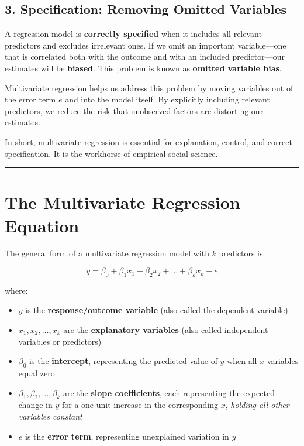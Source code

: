 \documentclass[
  letterpaper,
  DIV=11,
  numbers=noendperiod]{scrreprt}
\begin{document}
\subsection{3. Specification: Removing Omitted
Variables}\label{specification-removing-omitted-variables}

A regression model is \textbf{correctly specified} when it includes all
relevant predictors and excludes irrelevant ones. If we omit an
important variable---one that is correlated both with the outcome and
with an included predictor---our estimates will be \textbf{biased}. This
problem is known as \textbf{omitted variable bias}.

Multivariate regression helps us address this problem by moving
variables out of the error term \(e\) and into the model itself. By
explicitly including relevant predictors, we reduce the risk that
unobserved factors are distorting our estimates.

In short, multivariate regression is essential for explanation, control,
and correct specification. It is the workhorse of empirical social
science.

\begin{center}\rule{0.5\linewidth}{0.5pt}\end{center}

\section{The Multivariate Regression
Equation}\label{the-multivariate-regression-equation}

The general form of a multivariate regression model with \(k\)
predictors is:

\[
y = \beta_0 + \beta_1 x_1 + \beta_2 x_2 + \ldots + \beta_k x_k + e
\]

where:

\begin{itemize}
\item
  \(y\) is the \textbf{response/outcome variable} (also called the
  dependent variable)
\item
  \(x_1, x_2, \ldots, x_k\) are the \textbf{explanatory variables} (also
  called independent variables or predictors)
\item
  \(\beta_0\) is the \textbf{intercept}, representing the predicted
  value of \(y\) when all \(x\) variables equal zero
\item
  \(\beta_1, \beta_2, \ldots, \beta_k\) are the \textbf{slope
  coefficients}, each representing the expected change in \(y\) for a
  one-unit increase in the corresponding \(x\), \emph{holding all other
  variables constant}
\item
  \(e\) is the \textbf{error term}, representing unexplained variation
  in \(y\)
\end{itemize}
\end{document}
